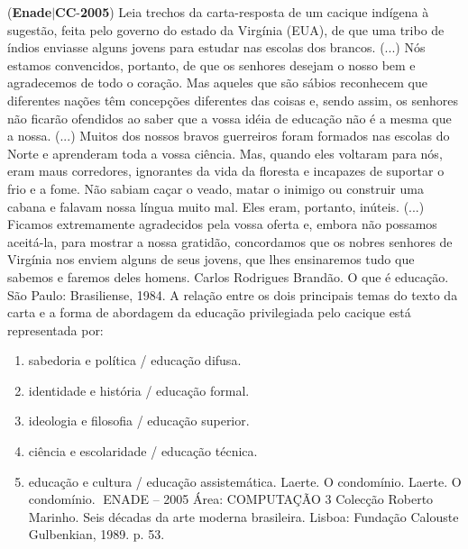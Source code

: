 \documentclass{exam}
\begin{document}
\begin{questions}
\question (\textbf{Enade}$|$\textbf{CC}-\textbf{2005}) Leia trechos da carta-resposta de um cacique indígena à sugestão, feita pelo governo do estado da Virgínia (EUA), de que uma tribo
de índios enviasse alguns jovens para estudar nas escolas dos brancos.
(...) Nós estamos convencidos, portanto, de que os senhores desejam o nosso bem e agradecemos de todo o coração. Mas
aqueles que são sábios reconhecem que diferentes nações têm concepções diferentes das coisas e, sendo assim, os senhores não
ficarão ofendidos ao saber que a vossa idéia de educação não é a mesma que a nossa. (...) Muitos dos nossos bravos guerreiros
foram formados nas escolas do Norte e aprenderam toda a vossa ciência. Mas, quando eles voltaram para nós, eram maus
corredores, ignorantes da vida da floresta e incapazes de suportar o frio e a fome. Não sabiam caçar o veado, matar o inimigo ou
construir uma cabana e falavam nossa língua muito mal. Eles eram, portanto, inúteis. (...) Ficamos extremamente agradecidos pela
vossa oferta e, embora não possamos aceitá-la, para mostrar a nossa gratidão, concordamos que os nobres senhores de Virgínia
nos enviem alguns de seus jovens, que lhes ensinaremos tudo que sabemos e faremos deles homens.
Carlos Rodrigues Brandão. O que é educação. São Paulo: Brasiliense, 1984.
A relação entre os dois principais temas do texto da carta e a forma de abordagem da educação privilegiada pelo cacique está
representada por:
	\begin{enumerate}[label=\alph*)]
		\item  sabedoria e política / educação difusa.
		\item  identidade e história / educação formal.
		\item  ideologia e filosofia / educação superior.
		\item  ciência e escolaridade / educação técnica.
		\item  educação e cultura / educação assistemática.
Laerte. O condomínio.
Laerte. O condomínio.
ENADE – 2005 Área: COMPUTAÇÃO 3
Colecção Roberto Marinho. Seis décadas da arte moderna
brasileira. Lisboa: Fundação Calouste Gulbenkian, 1989. p. 53.

	\end{enumerate}


\end{questions}
\end{document}
